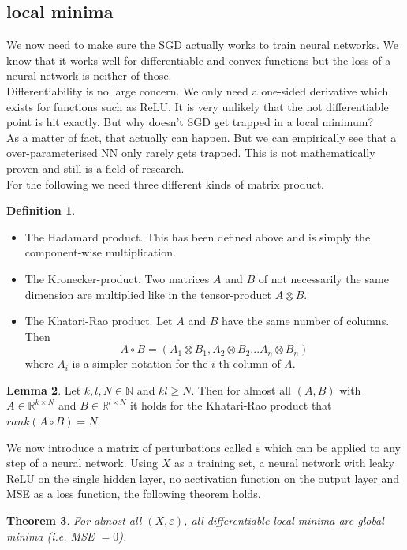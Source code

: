 \documentclass[a4paper, 12pt]{article}
\theoremstyle{plain}
\newtheorem{theorem}{Theorem}[subsection] %
\theoremstyle{definition}
\newtheorem{definition}[theorem]{Definition} %
\theoremstyle{lemma}
\newtheorem{lemma}[theorem]{Lemma}
\theoremstyle{remark}
\theoremstyle{example}
\begin{document}
	\subsection{local minima}
	We now need to make sure the SGD actually works to train neural networks. We know that it works well for differentiable and convex functions but the loss of a neural network is neither of those.\\
	Differentiability is no large concern. We only need a one-sided derivative which exists for functions such as ReLU. It is very unlikely that the not differentiable point is hit exactly. But why doesn't SGD get trapped in a local minimum?\\
	As a matter of fact, that actually can happen. But we can empirically see that a over-parameterised NN only rarely gets trapped. This is not mathematically proven and still is a field of research.\\
	For the following we need three different kinds of matrix product. 
	\begin{definition}
		\begin{itemize}
			\item The Hadamard product. This has been defined above and is simply the component-wise multiplication.
			\item The Kronecker-product. Two matrices $A$ and $B$ of not necessarily the same dimension are multiplied like in the tensor-product $A\otimes B$.
			\item The Khatari-Rao product. Let $A$ and $B$ have the same number of columns. Then \[A\circ B = (A_{1}\otimes B_{1}, A_{2}\otimes B_{2} ... A_{n}\otimes B_{n})\] where $A_{i}$ is a simpler notation for the $i$-th column of $A$.
		\end{itemize}
	\end{definition}
	\begin{lemma}
		Let $k,l,N \in \mathbb{N}$ and $kl \geq N$. Then for almost all $(A,B)$ with $A \in \mathbb{R}^{k\times N}$ and $B \in \mathbb{R}^{l\times N}$ it holds for the Khatari-Rao product that $rank(A\circ B) = N$.
	\end{lemma}
	We now introduce a matrix of perturbations called $\varepsilon$ which can be applied to any step of a neural network. Using $X$ as a training set, a neural network with leaky ReLU on the single hidden layer, no acctivation function on the output layer and MSE as a loss function, the following theorem holds.
	\begin{theorem}
		For almost all $(X,\varepsilon)$, all differentiable local minima are global minima (i.e. MSE $= 0$).
	\end{theorem} 
\end{document}
